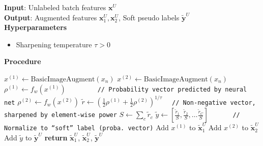 \begin{algorithm}[!h]
\caption{Augment and Soft-Pseudo-Label}
\label{alg:aug_softlabel}
\textbf{Input}: Unlabeled batch features $\mathbf{x}^U$
\\
\textbf{Output}: Augmented features $\mathbf{x}^U_1, \mathbf{x}^U_2$, Soft pseudo labels $\tilde{\mathbf{y}}^U$
\\
\textbf{Hyperparameters}
\begin{itemize}
	\item Sharpening temperature $\tau{>}0$
\end{itemize}
\textbf{Procedure}
\begin{algorithmic}[1] %
\STATE $x^{(1)} \gets \text{BasicImageAugment}(x_n)$
\STATE $x^{(2)} \gets \text{BasicImageAugment}(x_n)$
\STATE $\rho^{(1)} \gets f_w( x^{(1)} )$ \texttt{~~~~~~~~// Probability vector predicted by neural net}
\STATE $\rho^{(2)} \gets f_w( x^{(2)} )$
\STATE $\tilde{r} \gets \left( 
	  \frac{1}{2}\rho^{(1)} 
	+ \frac{1}{2}\rho^{(2)} \right)
	^{1 / \tau}$ \texttt{~~// Non-negative vector, sharpened by element-wise power}
\STATE $S \gets \sum_c \tilde{r}_c$
\STATE $\tilde{y} \gets [
	\frac{\tilde{r}_1}{S},
	\frac{\tilde{r}_2}{S},
	\ldots
	\frac{\tilde{r}_C}{S}]$ \texttt{~~~~~~// Normalize to ``soft'' label (proba. vector)}
\STATE Add $x^{(1)}$ to $\tilde{\mathbf{x}}^U_1$
\STATE Add $x^{(2)}$ to $\tilde{\mathbf{x}}^U_2$
\STATE Add $\tilde{y}$ to $\tilde{\mathbf{y}}^U$
\ENDFOR
\STATE \textbf{return} $\tilde{\mathbf{x}}^U_1$, $\tilde{\mathbf{x}}^U_2$, $\tilde{\mathbf{y}}^U$
\end{algorithmic}
\end{algorithm}

